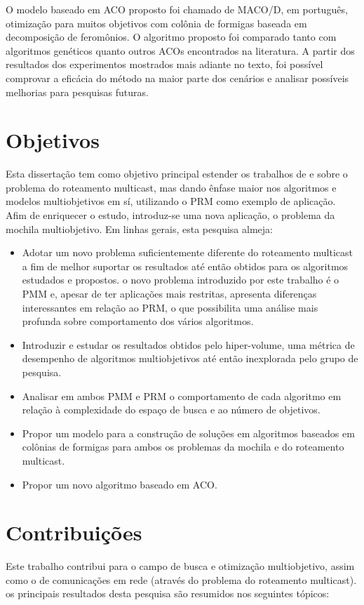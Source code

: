 O modelo baseado em \ac{ACO} proposto foi chamado de \ac{MACO/D}, em português, otimização para muitos objetivos com colônia de formigas baseada em decomposição de feromônios. O algoritmo proposto foi comparado tanto com algoritmos genéticos quanto outros \acp{ACO} encontrados na literatura. A partir dos resultados dos experimentos mostrados mais adiante no texto, foi possível comprovar a eficácia do método na maior parte dos cenários e analisar possíveis melhorias para pesquisas futuras.

\section{Objetivos}
Esta dissertação tem como objetivo principal estender os trabalhos de \cite{Lafeta2016} e \cite{Bueno2010} sobre o problema do roteamento multicast, mas dando ênfase maior nos algoritmos e modelos multiobjetivos em sí, utilizando o \ac{PRM} como exemplo de aplicação. Afim de enriquecer o estudo, introduz-se uma nova aplicação, o problema da mochila multiobjetivo. Em linhas gerais, esta pesquisa almeja:
 
\begin{itemize}  
	\item Adotar um novo problema suficientemente diferente do roteamento multicast a fim de melhor suportar os resultados até então obtidos para os algoritmos estudados e propostos. o novo problema introduzido por este trabalho é o \ac{PMM} e, apesar de ter aplicações mais restritas, apresenta diferenças interessantes em relação ao \ac{PRM}, o que possibilita uma análise mais profunda sobre comportamento dos vários algoritmos.
	\item Introduzir e estudar os resultados obtidos pelo hiper-volume, uma métrica de desempenho de algoritmos multiobjetivos até então inexplorada pelo grupo de pesquisa.
	\item Analisar em ambos \ac{PMM} e \ac{PRM} o comportamento de cada algoritmo em relação à complexidade do espaço de busca e ao número de objetivos.
	\item Propor um modelo para a construção de soluções em algoritmos baseados em colônias de formigas para ambos os problemas da mochila e do roteamento multicast.
	\item Propor um novo algoritmo baseado em \ac{ACO}.
\end{itemize}


\section{Contribuições}
Este trabalho contribui para o campo de busca e otimização multiobjetivo, assim como o de comunicações em rede (através do problema do roteamento multicast). os principais resultados desta pesquisa são resumidos nos seguintes tópicos:

